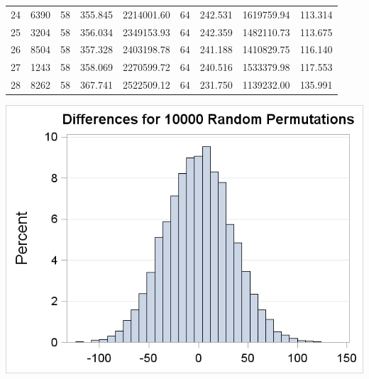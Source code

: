 \documentclass[letter]{article}
\begin{document}
\begin{enumerate}[leftmargin = 0 em, label = \arabic*., font = \bfseries]
\begin{table}[!htb]
\begin{tabular}{ccccccccc}
24&6390&58&355.845&2214001.60&64&242.531&1619759.94&113.314\\
25&3204&58&356.034&2349153.93&64&242.359&1482110.73&113.675\\
26&8504&58&357.328&2403198.78&64&241.188&1410829.75&116.140\\
27&1243&58&358.069&2270599.72&64&240.516&1533379.98&117.553\\
28&8262&58&367.741&2522509.12&64&231.750&1139232.00&135.991\\
\bottomrule
	\end{tabular}
	\end{table}

	\includegraphics[width = \textwidth]{guinea_random_permutation.png}
	
	
 	\end{enumerate}


	
	
	
	
\end{document}
